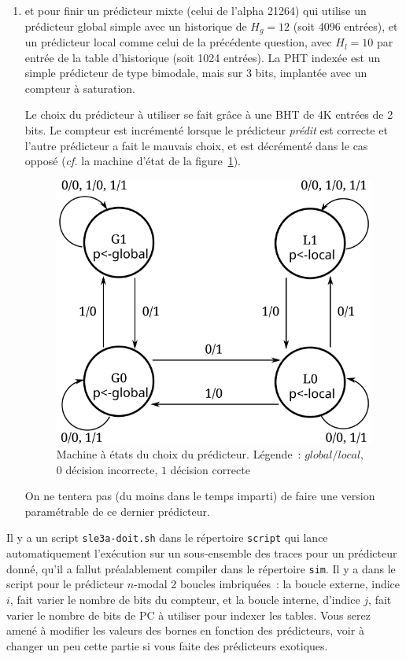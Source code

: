 \documentclass[a4paper]{article}
\begin{document}
\begin{enumerate}
\item et pour finir un prédicteur mixte (celui de l'alpha 21264) qui utilise un prédicteur global simple avec un historique de $H_g=12$ (soit 4096 entrées), et un prédicteur local comme celui de la précédente question, avec $H_l=10$ par entrée de la table d'historique (soit 1024 entrées).
      La PHT indexée est un simple prédicteur de type bimodale, mais sur 3 bits, implantée avec un compteur à saturation.

      Le choix du prédicteur à utiliser se fait grâce à une BHT de 4K entrées de 2 bits.
      Le compteur est incrémenté lorsque le prédicteur \emph{prédit} est correcte et l'autre prédicteur a fait le mauvais choix, et est décrémenté dans le cas opposé (\emph{cf.} la machine d'état de la figure~\ref{mixte-graphe}).
      \begin{figure}[hbt]\center\leavevmode
      \includegraphics[scale=0.7]{mixte-graphe}
      \caption{Machine à états du choix du prédicteur.
      Légende~: $global/local$, $0$ décision incorrecte, $1$ décision correcte}
      \label{mixte-graphe}
      \end{figure}

      On ne tentera pas (du moins dans le temps imparti) de faire une version paramétrable de ce dernier prédicteur.
\end{enumerate}

Il y a un script \verb+sle3a-doit.sh+ dans le répertoire \verb+script+ qui lance automatiquement l'exécution sur un sous-ensemble des traces pour un prédicteur donné, qu'il a fallut préalablement compiler dans le répertoire \verb+sim+.
Il y a dans le script pour le prédicteur $n$-modal 2 boucles imbriquées~: la boucle externe, indice $i$, fait varier le nombre de bits du compteur, et la boucle interne, d'indice $j$, fait varier le nombre de bits de PC à utiliser pour indexer les tables.
Vous serez amené à modifier les valeurs des bornes en fonction des prédicteurs, voir à changer un peu cette partie si vous faite des prédicteurs exotiques.
\end{document}
